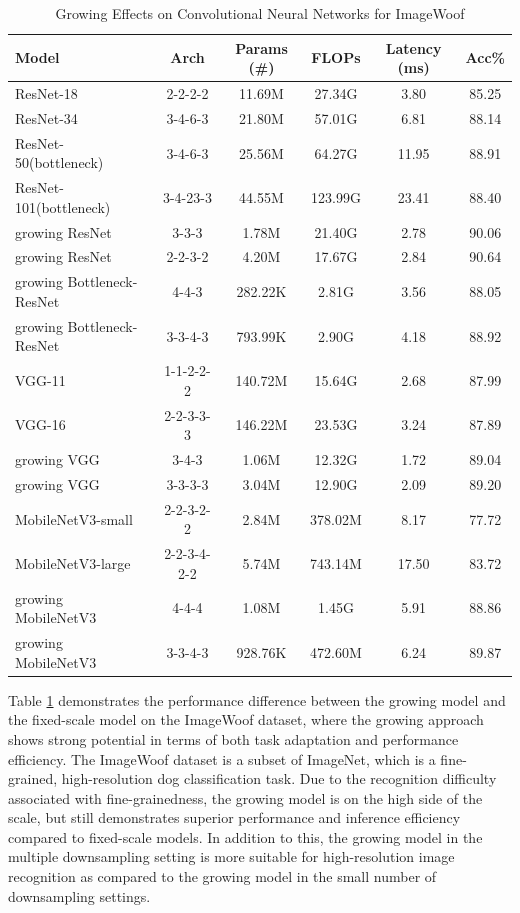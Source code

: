 \documentclass[preprint,12pt]{elsarticle}
\begin{document}
\begin{table}[ht]
\centering
\tiny
\renewcommand{\arraystretch}{1.3}
\begin{adjustbox}{center}
\begin{tabular}{lccccc}
\hline
\textbf{Model} & \textbf{Arch} & \textbf{Params (\#)} & \textbf{FLOPs} & \textbf{Latency (ms)} & \textbf{Acc\%} \\
\hline
ResNet-18 & 2-2-2-2 & 11.69M & 27.34G & 3.80 & 85.25 \\
ResNet-34 & 3-4-6-3 & 21.80M & 57.01G & 6.81 & 88.14 \\
ResNet-50(bottleneck) & 3-4-6-3 & 25.56M & 64.27G & 11.95 & 88.91 \\
ResNet-101(bottleneck) & 3-4-23-3 & 44.55M & 123.99G & 23.41 & 88.40 \\
growing ResNet & 3-3-3 & 1.78M & 21.40G & 2.78 & 90.06 \\
growing ResNet & 2-2-3-2 & 4.20M & 17.67G & 2.84 & 90.64 \\
growing Bottleneck-ResNet & 4-4-3 & 282.22K & 2.81G & 3.56 & 88.05 \\
growing Bottleneck-ResNet & 3-3-4-3 & 793.99K & 2.90G & 4.18 & 88.92 \\ \hline
VGG-11 & 1-1-2-2-2 & 140.72M & 15.64G & 2.68 & 87.99 \\
VGG-16 & 2-2-3-3-3 & 146.22M & 23.53G & 3.24 & 87.89 \\
growing VGG & 3-4-3 & 1.06M & 12.32G & 1.72 & 89.04 \\
growing VGG & 3-3-3-3 & 3.04M & 12.90G & 2.09 & 89.20 \\ \hline
MobileNetV3-small & 2-2-3-2-2 & 2.84M & 378.02M & 8.17 & 77.72 \\
MobileNetV3-large & 2-2-3-4-2-2 & 5.74M & 743.14M & 17.50 & 83.72 \\
growing MobileNetV3 & 4-4-4 & 1.08M & 1.45G & 5.91 & 88.86 \\
growing MobileNetV3 & 3-3-4-3 & 928.76K & 472.60M & 6.24 & 89.87 \\
\hline
\end{tabular}
\end{adjustbox}
\caption{Growing Effects on Convolutional Neural Networks for ImageWoof}
\label{table:imagewoof_self_growth}
\end{table}

Table \ref{table:imagewoof_self_growth} demonstrates the performance difference between the growing model and the fixed-scale model on the ImageWoof dataset, where the growing approach shows strong potential in terms of both task adaptation and performance efficiency. The ImageWoof dataset is a subset of ImageNet, which is a fine-grained, high-resolution dog classification task. Due to the recognition difficulty associated with fine-grainedness, the growing model is on the high side of the scale, but still demonstrates superior performance and inference efficiency compared to fixed-scale models. In addition to this, the growing model in the multiple downsampling setting is more suitable for high-resolution image recognition as compared to the growing model in the small number of downsampling settings.
\end{document}
